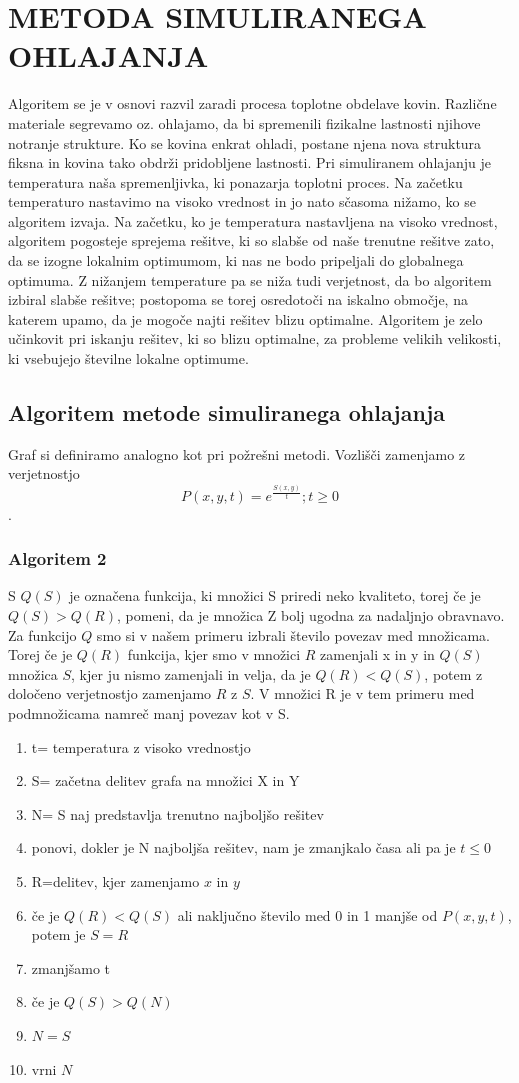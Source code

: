 \documentclass[12pt,a4paper]{amsart}
\theoremstyle{definition} %
\theoremstyle{plain} %
\begin{document}
\section{\textbf{METODA SIMULIRANEGA OHLAJANJA}}
Algoritem se je v osnovi razvil zaradi procesa toplotne obdelave kovin. Različne materiale segrevamo oz. ohlajamo, da bi spremenili fizikalne lastnosti njihove notranje strukture. Ko se kovina enkrat ohladi, postane njena nova struktura fiksna in kovina tako obdrži pridobljene lastnosti. Pri simuliranem ohlajanju je temperatura naša spremenljivka, ki ponazarja toplotni proces. Na začetku temperaturo nastavimo na visoko vrednost in jo nato sčasoma nižamo, ko se algoritem izvaja. Na začetku, ko je temperatura nastavljena na visoko vrednost, algoritem pogosteje sprejema rešitve, ki so slabše od naše trenutne rešitve zato, da se izogne lokalnim optimumom, ki nas ne bodo pripeljali do globalnega optimuma. Z nižanjem temperature pa se niža tudi verjetnost, da bo algoritem izbiral slabše rešitve; postopoma se torej osredotoči na iskalno območje, na katerem upamo, da je mogoče najti rešitev blizu optimalne. Algoritem je zelo učinkovit pri iskanju rešitev, ki so blizu optimalne, za probleme velikih velikosti, ki vsebujejo številne lokalne optimume.

\subsection{Algoritem metode simuliranega ohlajanja}
Graf si definiramo analogno kot pri požrešni metodi. Vozlišči zamenjamo z verjetnostjo $$P(x,y,t) = e^{\frac{S(x,y)}{t}}; t\ge 0$$.

\subsubsection{Algoritem 2}
S $Q(S)$ je označena funkcija, ki množici S priredi neko kvaliteto, torej če je $Q(S) >Q(R)$, pomeni, da je množica Z bolj ugodna za nadaljnjo obravnavo.
Za funkcijo $Q$ smo si v našem primeru izbrali število povezav med množicama. Torej če je $Q(R)$ funkcija, kjer smo v množici $R$ zamenjali x in y in $Q(S)$ množica $S$, kjer ju nismo zamenjali in velja, da je $Q(R)<Q(S)$, potem z določeno verjetnostjo zamenjamo $R$ z $S$. V množici R je v tem primeru med podmnožicama namreč manj povezav kot v S.
\begin{enumerate}
\item t= temperatura z visoko vrednostjo
\item S= začetna delitev grafa na množici X in Y 
\item N= S  naj predstavlja trenutno najboljšo rešitev
\item ponovi, dokler je N najboljša rešitev, nam je zmanjkalo časa ali pa je $t \leq 0$
\item 			R=delitev, kjer zamenjamo $x$ in $y$
\item 			če je $Q(R)<Q(S)$ ali naključno število med 0 in 1 manjše od $P(x,y,t)$, potem je $S=R$
\item 			zmanjšamo t
\item 			če je $Q(S)>Q(N)$ 
\item 				$N=S$
\item vrni $N$		
\end{enumerate}
\end{document}
